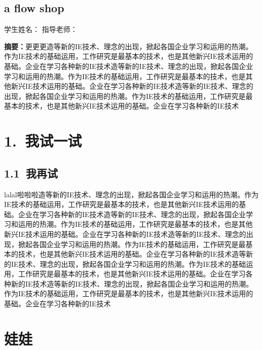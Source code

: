 \begin{Abstract}
\chapter{a flow shop}
\begin{center}
\vspace{2mm}
{
\xiaosi

 学生姓名：\extt[2.8em]{\skyauthornamec}\hspace{20mm} 指导老师：\extt[6.4em]{\skymentorc}
}
\end{center}
{\wuhao \songti %
\noindent \textbf{摘要：}更更更造等新的IE技术、理念的出现，掀起各国企业学习和运用的热潮。作为IE技术的基础运用，工作研究是最基本的技术，也是其他新兴IE技术运用的基础。企业在学习各种新的IE技术造等新的IE技术、理念的出现，掀起各国企业学习和运用的热潮。作为IE技术的基础运用，工作研究是最基本的技术，也是其他新兴IE技术运用的基础。企业在学习各种新的IE技术造等新的IE技术、理念的出现，掀起各国企业学习和运用的热潮。作为IE技术的基础运用，工作研究是最基本的技术，也是其他新兴IE技术运用的基础。企业在学习各种新的IE技术

}
\end{Abstract}
\chapter*{1.~我试一试}
\section*{1.1~我再试}
lalal啦啦啦造等新的IE技术、理念的出现，掀起各国企业学习和运用的热潮。作为IE技术的基础运用，工作研究是最基本的技术，也是其他新兴IE技术运用的基础。企业在学习各种新的IE技术造等新的IE技术、理念的出现，掀起各国企业学习和运用的热潮。作为IE技术的基础运用，工作研究是最基本的技术，也是其他新兴IE技术运用的基础。企业在学习各种新的IE技术造等新的IE技术、理念的出现，掀起各国企业学习和运用的热潮。作为IE技术的基础运用，工作研究是最基本的技术，也是其他新兴IE技术运用的基础。企业在学习各种新的IE技术造等新的IE技术、理念的出现，掀起各国企业学习和运用的热潮。作为IE技术的基础运用，工作研究是最基本的技术，也是其他新兴IE技术运用的基础。企业在学习各种新的IE技术造等新的IE技术、理念的出现，掀起各国企业学习和运用的热潮。作为IE技术的基础运用，工作研究是最基本的技术，也是其他新兴IE技术运用的基础。企业在学习各种新的IE技术
\chapter*{娃娃}